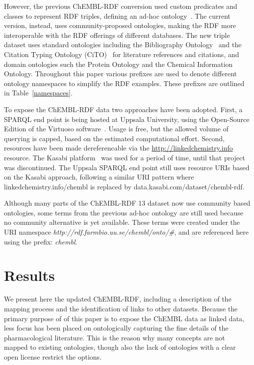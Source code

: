 \documentclass[10pt]{bmc_article}
\newenvironment{bmcformat}{\begin{raggedright}\baselineskip20pt\sloppy\setboolean{publ}{false}}{\end{raggedright}\baselineskip20pt\sloppy}
\begin{document}
\begin{bmcformat}
However, the previous ChEMBL-RDF conversion used custom predicates and classes to represent RDF triples, defining
an ad-hoc ontology~\cite{Willighagen2011}. The current version, instead, uses community-proposed
ontologies, making the RDF more interoperable with the RDF offerings of different databases. 
The new triple dataset uses standard ontologies
including the Bibliography Ontology~\cite{Giasson2011} and the Citation Typing Ontology (CiTO)~\cite{Shotton2010} for literature
references and citations, and domain ontologies such the Protein Ontology\cite{Sidhu2006} and the Chemical Information
Ontology\cite{Hastings2011}. Throughout this paper various prefixes are used to denote different ontology 
namespaces to simplify the RDF examples. These prefixes are outlined in Table~\ref{namespaces}.

To expose the ChEMBL-RDF data two approaches have been adopted. First, a SPARQL end point is being
hosted at Uppsala University, using the Open-Source Edition of the Virtuoso software~\cite{Virtuoso}. Usage is free, but the
allowed volume of querying is capped, based on the estimated computational effort. Second, resources have
been made dereferencable via the \url{http://linkedchemistry.info} resource. The Kasabi
platform~\cite{kasabi} was used for a period of time, until that project was discontinued.
The Uppsala SPARQL end point still uses resource URIs based on the Kasabi approach, following a similar
URI pattern where linkedchemistry.info/chembl is replaced by data.kasabi.com/dataset/chembl-rdf.

Although many parts of the ChEMBL-RDF 13 dataset now use community based ontologies, some 
terms from the previous ad-hoc ontology are still used because no community alternative is yet available. 
These terms were created under the 
URI namespace \textit{http://rdf.farmbio.uu.se/chembl/onto/\#}, and are referenced here using the
prefix: \textit{chembl}.


\section*{Results}
\label{s3}

We present here the updated ChEMBL-RDF, including a description of the mapping process 
and the identification of links to other datasets. Because the primary purpose of of this
paper is to expose the ChEMBL data as linked data, less focus has been placed on ontologically
capturing the fine details of the pharmacological literature. This is the reason why
many concepts are not mapped to existing ontologies, though also the lack of ontologies
with a clear open license restrict the options.


\end{bmcformat}
\end{document}
